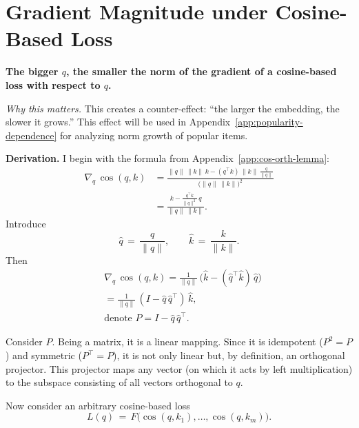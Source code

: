 \section{Gradient Magnitude under Cosine-Based Loss}
\label{app:cosine-growth-rate}

\textbf{The bigger $q$, the smaller the norm of the gradient of a cosine-based loss with respect to $q$.}

\emph{Why this matters.} This creates a counter-effect: “the larger the embedding, the slower it grows.” This effect will be used in Appendix~\ref{app:popularity-dependence} for analyzing norm growth of popular items.

\medskip
\noindent\textbf{Derivation.} I begin with the formula from Appendix~\ref{app:cos-orth-lemma}:
\begin{equation}
\label{eq:grad-cos-base}
\begin{aligned}
\nabla_{q}\,\cos(q,k)
&= \frac{\|q\|\,\|k\|\,k - (q^{\!\top}k)\,\|k\|\,\tfrac{q}{\|q\|}}{\bigl(\|q\|\,\|k\|\bigr)^2} \\
&= \frac{k - \tfrac{q^{\!\top}k}{\|q\|^2}\,q}{\|q\|\,\|k\|}.
\end{aligned}
\end{equation}
Introduce
\begin{equation}
\hat q \,=\, \frac{q}{\|q\|},\qquad \hat k \,=\, \frac{k}{\|k\|}.
\end{equation}
Then
\begin{equation}
\begin{aligned}
&\nabla_{q}\,\cos(q,k)
= \frac{1}{\|q\|}\,\bigl(\hat k - (\hat q^{\!\top}\hat k)\,\hat q\bigr) \\
&= \frac{1}{\|q\|}\,(I - \hat q\,\hat q^{\!\top})\,\hat k,\\ &\text{denote } P = I - \hat q\,\hat q^{\!\top}.
\end{aligned}
\end{equation}

Consider $P$. Being a matrix, it is a linear mapping. Since it is idempotent ($P^2=P$) and symmetric ($P^{\!\top}=P$), it is not only linear but, by definition, an orthogonal projector. This projector maps any vector (on which it acts by left multiplication) to the subspace consisting of all vectors orthogonal to $q$.

Now consider an arbitrary cosine-based loss
\begin{equation}
L(q) \,=\, F\big(\cos(q,k_1),\dots,\cos(q,k_m)\big).
\end{equation}


